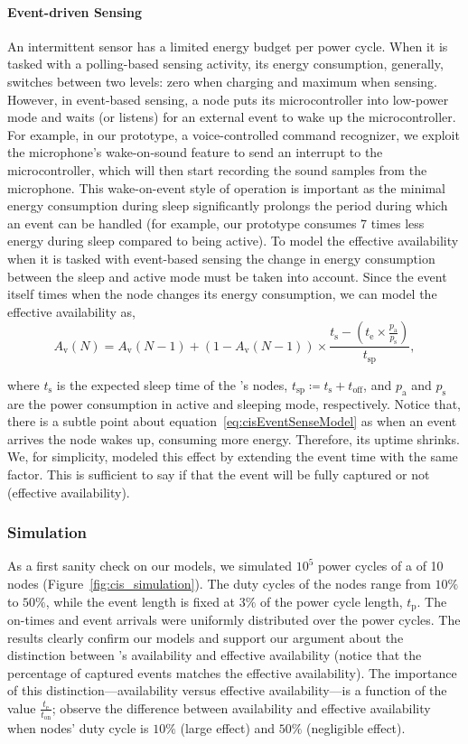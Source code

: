 \paragraph{Event-driven Sensing}
An intermittent sensor has a limited energy budget per power cycle. When it is tasked with a polling-based sensing activity, its energy consumption, generally, switches between two levels: zero when charging and maximum when sensing. However, in event-based sensing, a node puts its microcontroller into low-power mode and waits (or listens) for an external event to wake up the microcontroller. For example, in our prototype, a voice-controlled command recognizer, we exploit the microphone's wake-on-sound feature to send an interrupt to the microcontroller, which will then start recording the sound samples from the microphone. 
This wake-on-event style of operation is important as the minimal energy consumption during sleep significantly prolongs the period during which an event can be handled (for example, our prototype consumes 7 times less energy during sleep compared to being active).
To model the effective \cis availability when it is tasked with event-based sensing the change in energy consumption between the sleep and active mode must be taken into account. Since the event itself times when the node changes its energy consumption, we can model the effective availability as,
\begin{equation}
		A_\text{v}(N) = A_\text{v}(N-1) + \left(1-A_\text{v}(N-1)\right) \times \frac{t_\text{s} - (t_\text{e} \times\frac{p_\text{a}}{p_\text{s}}) }{t_\text{sp}},
		\label{eq:cisEventSenseModel}
\end{equation}

where $t_\text{s}$ is the expected sleep time of the \cis's nodes, 
 $t_\text{sp} \coloneqq t_\text{s} + t_\text{off}$, 
 and $p_\text{a}$ and $p_\text{s}$ are the power consumption in active and sleeping mode, respectively.
 Notice that, there is a subtle point about equation~\ref{eq:cisEventSenseModel} as when an event arrives the node wakes up, consuming more energy. Therefore, its uptime shrinks. We, for simplicity, modeled this effect by extending the event time with the same factor. This is sufficient to say if that the event will be fully captured or not (effective availability).
%
\subsubsection{Simulation}
As a first sanity check on our models, we simulated $10^5$ power cycles of a \cis of 10 nodes (Figure~\ref{fig:cis_simulation}). The duty cycles of the nodes range from $10\%$ to $50\%$, while the event length is fixed at $3\%$ of the power cycle length, $t_\text{p}$. The on-times and event arrivals were uniformly distributed over the power cycles. 
The results clearly confirm our models and support our argument about the distinction between \cis's availability and effective availability (notice that the percentage of captured events matches the effective availability). 
The importance of this distinction---availability versus effective availability---is a function of the value $\frac{t_\text{e}}{t_\text{on}}$; observe the difference between availability and effective availability when nodes' duty cycle is $10\%$ (large effect) and $50\%$ (negligible effect).
%
%
